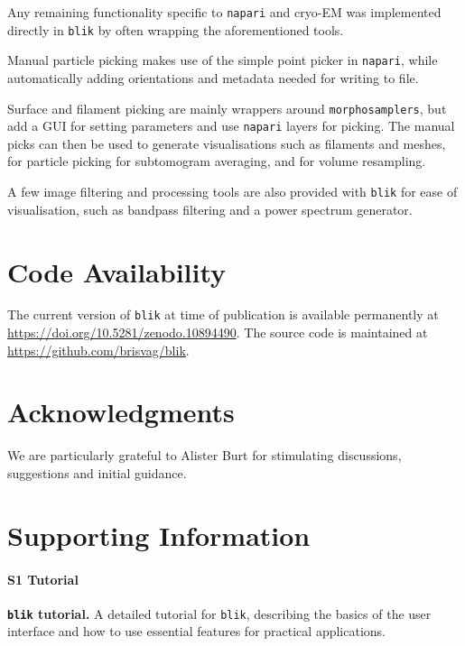 Any remaining functionality specific to \texttt{napari} and cryo-EM was implemented directly in \texttt{blik} by often wrapping the aforementioned tools.

Manual particle picking makes use of the simple point picker in \texttt{napari}, while automatically adding orientations and metadata needed for writing to file.

Surface and filament picking are mainly wrappers around \texttt{morphosamplers}, but add a GUI for setting parameters and use \texttt{napari} layers for picking. The manual picks can then be used to generate visualisations such as filaments and meshes, for particle picking for subtomogram averaging, and for volume resampling.

A few image filtering and processing tools are also provided with \texttt{blik} for ease of visualisation, such as bandpass filtering and a power spectrum generator.

\section{Code Availability}

The current version of \texttt{blik} at time of publication is available permanently at \url{https://doi.org/10.5281/zenodo.10894490}. The source code is maintained at \url{https://github.com/brisvag/blik}.

\section{Acknowledgments}

We are particularly grateful to Alister Burt for stimulating discussions, suggestions and initial guidance.

\section{Supporting Information}

\paragraph*{S1 Tutorial}
\label{S1_Tutorial}
{\bf \texttt{blik} tutorial.} A detailed tutorial for \texttt{blik}, describing the basics of the user interface and how to use essential features for practical applications.
